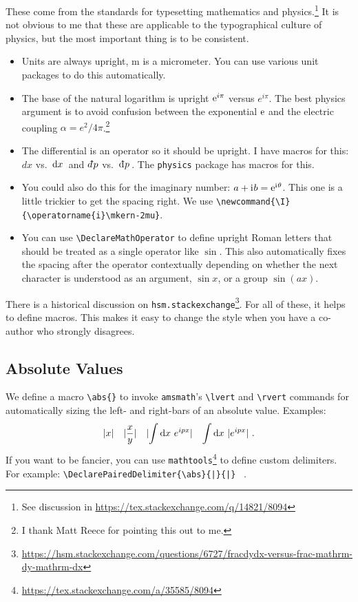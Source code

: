 These come from the  standards for typesetting mathematics and physics.\footnote{See discussion in \url{https://tex.stackexchange.com/q/14821/8094}} It is not obvious to me that these are applicable to the typographical culture of physics, but the most important thing is to be consistent.
\begin{itemize}
	\item Units are always upright, \textmu m is a micrometer. You can use various unit packages to do this automatically. 
	\item The base of the natural logarithm is upright $\operatorname{e}^{i\pi}$ versus $e^{i\pi}$. The best physics argument is to avoid confusion between the exponential $\operatorname{e}$ and the electric coupling $\alpha = e^2/4\pi$.\footnote{I thank Matt Reece for pointing this out to me.}
	\item The differential is an operator so it should be upright. I have macros for this: $dx$ vs.~$\operatorname{d}\mkern-3mu^{}\mkern-1mu{x}\,$ and $\dbar p$ vs.~$\Dbar{p}$. The \texttt{physics} package has macros for this. 
	\item You could also do this for the imaginary number: $a+\I b = \e^{\I \theta}$. This one is a little trickier to get the spacing right. We use \verb!\newcommand{\I}{\operatorname{i}\mkern-2mu}!.
	\item You can use \verb!\DeclareMathOperator! to define upright Roman letters that should be treated as a single operator like $\sin$. This also automatically fixes the spacing after the operator contextually depending on whether the next character is understood as an argument, $\sin x$, or a group $\sin(ax)$.
\end{itemize}
There is a historical discussion on \texttt{hsm.stackexchange}\footnote{\url{https://hsm.stackexchange.com/questions/6727/fracdydx-versus-frac-mathrm-dy-mathrm-dx}}.  For all of these, it helps to define macros. This makes it easy to change the style when you have a co-author who strongly disagrees.

\subsection{Absolute Values}

We define a macro \verb!\abs{}! to invoke \texttt{amsmath}'s \verb!\lvert! and \verb!\rvert! commands for automatically sizing the left- and right-bars of an absolute value. Examples:
\begin{align}
	\abs{x} &&
	\abs{\frac{x}{y}} &&
	\abs{\int \D{x} \, e^{i px}} &&
	\int \D{x} \, \abs{e^{i px}}
	\ .
\end{align}
If you want to be fancier, you can use \texttt{mathtools}\footnote{\url{https://tex.stackexchange.com/a/35585/8094}} to define custom delimiters. For example:
\verb!\DeclarePairedDelimiter{\abs}{|}{|}! \, .


